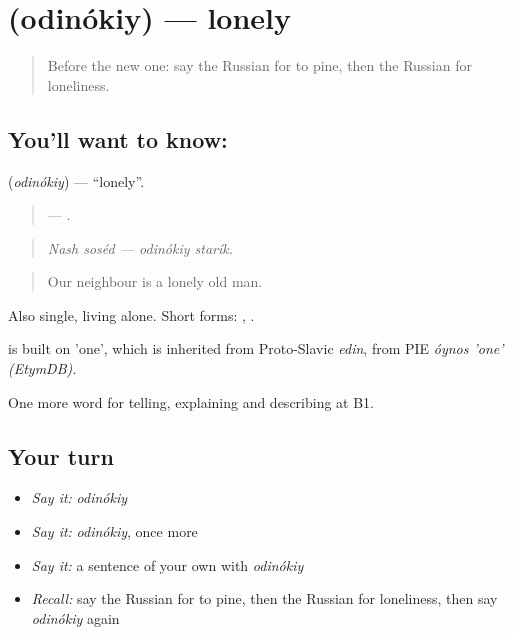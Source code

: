 \section[\texorpdfstring{\ru{одинокий} (odinókiy)}{одинокий (odinókiy)}]{ (odinókiy) — lonely}

\label{lesson:RU-C477-odinokiy}



\begin{quote}
Before the new one: say the Russian for to pine, then the Russian for loneliness.
\end{quote}

\subsection*{You'll want to know: }
\textbf{} (\emph{odinókiy}) — \textquotedblleft{}lonely\textquotedblright{}.

\begin{quote}
  —  .
\end{quote}

\begin{quote}
\emph{Nash soséd — odinókiy starík.}
\end{quote}

\begin{quote}
Our neighbour is a lonely old man.
\end{quote}

Also single, living alone. Short forms: , .

\begin{cousinweb}
\emph{} is built on \emph{} 'one', which is inherited from Proto-Slavic \emph{edin}, from PIE \emph{óynos 'one' (EtymDB).}
\end{cousinweb}

\begin{grammarlens}[title={What you've built}]
One more word for telling, explaining and describing at B1.
\end{grammarlens}

\subsection*{Your turn}
\begin{itemize}
\raggedright
  \item \emph{Say it:} \emph{odinókiy}
  \item \emph{Say it:} \emph{odinókiy}, once more
  \item \emph{Say it:} a sentence of your own with \emph{odinókiy}
  \item \emph{Recall:} say the Russian for to pine, then the Russian for loneliness, then say \emph{odinókiy} again
\end{itemize}

